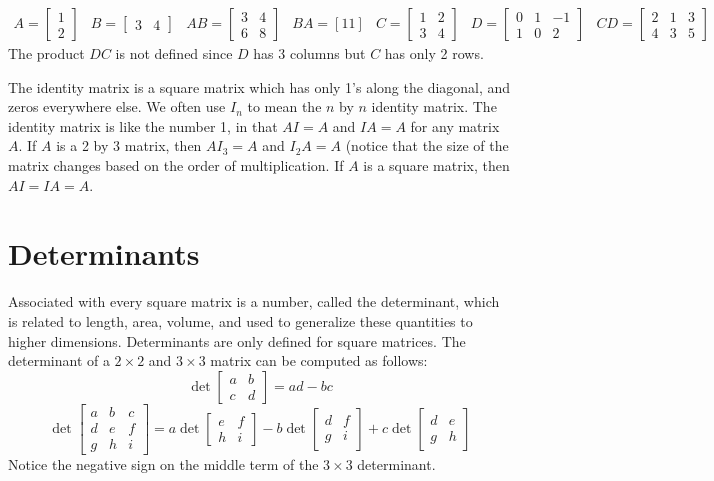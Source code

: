 \documentclass[10pt]{article}
\begin{document}
$$\begin{array}{cccc}
A=\begin{bmatrix} 1\\2\end{bmatrix}&
B=\begin{bmatrix} 3&4\end{bmatrix}&
AB= \begin{bmatrix} 3&4\\6&8\end{bmatrix} &
BA = [11]\end{array}
\begin{array}{ccc}
C =\begin{bmatrix} 1&2\\3&4\end{bmatrix}&
D =\begin{bmatrix} 0&1&-1\\1&0&2\end{bmatrix}&
CD =\begin{bmatrix} 2&1&3\\4&3&5\end{bmatrix}
\end{array}$$
The product $DC$ is not defined since $D$ has 3 columns but $C$ has only 2 rows.

The identity matrix is a square matrix which has only 1's along the diagonal, and zeros everywhere else. We often use $I_n$ to mean the $n$ by $n$ identity matrix. The identity matrix is like the number 1, in that $AI=A$ and $IA=A$ for any matrix $A$.  If $A$ is a 2 by 3 matrix, then $AI_3=A$ and $I_2A=A$ (notice that the size of the matrix changes based on the order of multiplication.  If $A$ is a square matrix, then $AI=IA=A$.


\section{Determinants}
Associated with every square matrix is a number, called the determinant, which is related to length, area, volume, and used to generalize these quantities to higher dimensions. Determinants are only defined for square matrices.
The determinant of a {$2\times 2$} and {$3\times 3$} matrix can be computed as follows: 
$$ \det\begin{bmatrix}a&b\\c&d\end{bmatrix} = ad-bc$$
$$\det\begin{bmatrix}a&b&c\\d&e&f\\g&h&i\end{bmatrix} = a\det\begin{bmatrix}e&f\\h&i\end{bmatrix} -b\det\begin{bmatrix}d&f\\g&i\end{bmatrix} +c\det\begin{bmatrix}d&e\\g&h\end{bmatrix}$$
Notice the negative sign on the middle term of the {$3 \times 3$} determinant. 
\end{document}
